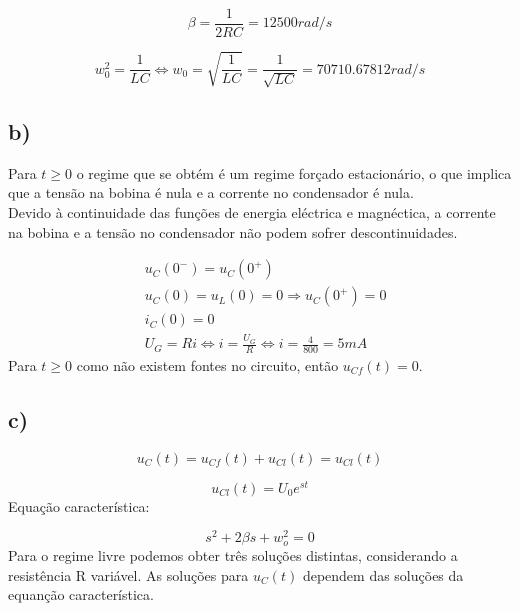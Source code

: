 \begin{equation}
    \beta = \frac{1}{2RC} = 12500 rad/s
\end{equation}

\begin{equation}
    w_0^2 = \frac{1}{LC} \Leftrightarrow w_0 = \sqrt{\frac{1}{LC}} = \frac{1}{\sqrt{LC}} = 70710.67812 rad/s
\end{equation}

\subsection*{b)}
Para $t\geq0$ o regime que se obtém é um regime forçado estacionário, o que implica que a tensão na bobina é nula e a corrente no condensador é nula.
\\Devido à continuidade das funções de energia eléctrica e magnéctica, a corrente na bobina e a tensão no condensador não podem sofrer descontinuidades.

\begin{equation}
    \begin{aligned}
        &u_C (0^-) = u_C (0^+)\\
        &u_C (0) = u_L (0) = 0 \Rightarrow u_C(0^+) = 0\\
        &i_C(0) = 0\\
        &U_G = Ri \Leftrightarrow i = \frac{U_G}{R} \Leftrightarrow i = \frac{4}{800} = 5 mA
    \end{aligned}
\end{equation}
Para $t\geq0$ como não existem fontes no circuito, então $u_{Cf}(t) = 0$.

\subsection*{c)}

\begin{equation}
    u_C(t) = u_{Cf}(t) + u_{Cl} (t) = u_{Cl}(t)
\end{equation}

\begin{equation}
    u_{Cl}(t) = U_0 e^{st}
\end{equation}
Equação característica: 

\begin{equation}
    s^2+2\beta s + w_o^2 = 0
\end{equation}
Para o regime livre podemos obter três soluções distintas, considerando a resistência R variável.
As soluções para $u_C(t)$ dependem das soluções da equanção característica.

